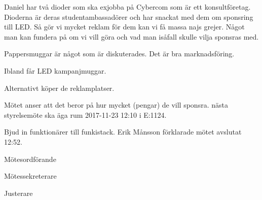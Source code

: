 \documentclass[10pt]{article}
\def\mo{Erik Månsson}
\def\ms{Johan Karlberg}
\def\ji{Sophia Grimmeiss Grahm}
\begin{document}
\begin{paragrafer}
\Mbaby
{}
Daniel har två dioder som ska exjobba på Cybercom som är ett konsultföretag. Dioderna är deras studentambassadörer och har snackat med dem om sponsring till LED. Så gör vi mycket reklam för dem kan vi få massa najs grejer. Något man kan fundera på om vi vill göra och vad man isåfall skulle vilja sponsras med.

Pappersmuggar är något som är diskuterades. Det är bra marknadsföring.

Ibland får LED kampanjmuggar.

Alternativt köper de reklamplatser.

Mötet anser att det beror på hur mycket (pengar) de vill sponsra.
{\Mba} nästa styrelsemöte ska äga rum 2017-11-23 12:10 i E:1124.

{\Ibfu}

Bjud in funktionärer till funkistack.
{\mo} förklarade mötet avslutat 12:52.

\end{paragrafer}

\newpage
\hidesignfoot
\begin{signatures}{3}
\signature{\mo}{Mötesordförande}
\signature{\ms}{Mötessekreterare}
\signature{\ji}{Justerare}
\end{signatures}
\end{document}
